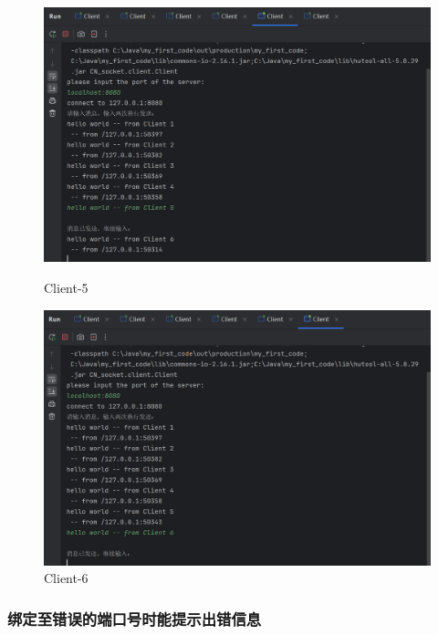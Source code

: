 \documentclass{article}
\begin{document}
	\begin{figure}[H]
		\centering
		\begin{minipage}[b]{0.45\textwidth}
			\includegraphics[width=\textwidth]{./images/2.支持5个以上客户端同时发送消息并逐一打印-Client5.png}
			\caption{Client-5}
		\end{minipage}
		\hfill
		\begin{minipage}[b]{0.45\textwidth}
			\includegraphics[width=\textwidth]{./images/2.支持5个以上客户端同时发送消息并逐一打印-Client6.png}
			\caption{Client-6}
		\end{minipage}
	\end{figure}
	
	\subsubsection{绑定至错误的端口号时能提示出错信息}
	
\end{document}
